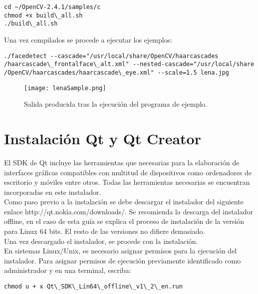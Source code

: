 \begin{lstlisting}[style=consola]
cd ~/OpenCV-2.4.1/samples/c
chmod +x build\_all.sh
./build\_all.sh
\end{lstlisting}

Una vez compilados se procede a ejecutar los ejemplos:\\

\begin{lstlisting}[style=consola]
./facedetect --cascade="/usr/local/share/OpenCV/haarcascades
/haarcascade\_frontalface\_alt.xml" --nested-cascade="/usr/local/share
/OpenCV/haarcascades/haarcascade\_eye.xml" --scale=1.5 lena.jpg
\end{lstlisting}

\begin{figure}[H]
  \begin{center}
    \texttt{[image: lenaSample.png]}
  \end{center}
  \caption{Salida producida tras la ejecución del programa de ejemplo.}
  \label{subsistemas}
\end{figure}

\section {Instalación Qt y Qt Creator}

El SDK de Qt incluye las herramientas que necesarias para la elaboración de interfaces gráficas compatibles con multitud de dispositivos como ordenadores de escritorio y móviles entre otros. Todas las herramientas necesarias se encuentran incorporadas en este instalador. \\

Como paso previo a la instalación se debe descargar el instalador del siguiente enlace http://qt.nokia.com/downloads/. Se recomienda la descarga del instalador offline, en el caso de esta guía se explica el proceso de instalación de la versión para Linux 64 bits. El resto de las versiones no difiere demasiado.\\

Una vez descargado el instalador, se procede con la instalación.\\

En sistemas Linux/Unix, es necesario asignar permisos para la ejecución del instalador. Para asignar permisos de ejecución previamente identificado como administrador y en una terminal, escriba:\\

\begin{lstlisting}[style=consola]
chmod u + x Qt\_SDK\_Lin64\_offline\_v1\_2\_en.run
\end{lstlisting}

